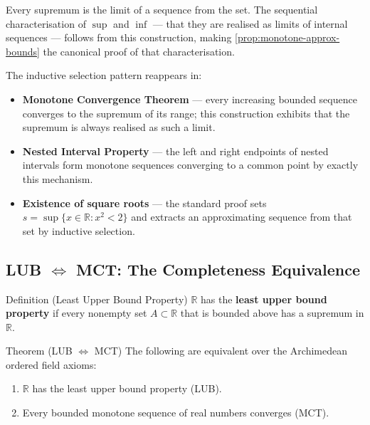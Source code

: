 \begin{remark}[Consequence]
Every supremum is the limit of a sequence from the set. The sequential
characterisation of $\sup$ and $\inf$ — that they are realised as limits
of internal sequences — follows from this construction, making
\cref{prop:monotone-approx-bounds} the canonical proof of that
characterisation.
\end{remark}

\begin{remark}
The inductive selection pattern reappears in:
\begin{itemize}
  \item \textbf{Monotone Convergence Theorem} — every increasing bounded
        sequence converges to the supremum of its range; this construction
        exhibits that the supremum is always realised as such a limit.
  \item \textbf{Nested Interval Property} — the left and right endpoints
        of nested intervals form monotone sequences converging to a common
        point by exactly this mechanism.
  \item \textbf{Existence of square roots} — the standard proof sets
        $s=\sup\{x\in\mathbb{R}:x^2<2\}$ and extracts an approximating
        sequence from that set by inductive selection.
\end{itemize}
\end{remark}

\subsection*{LUB $\Longleftrightarrow$ MCT: The Completeness Equivalence}
\label{subsec:LUB-MCT}

\begin{definitionbox}{Definition (Least Upper Bound Property)}
\label{def:LUB}
$\mathbb{R}$ has the \textbf{least upper bound property} if every nonempty
set $A\subset\mathbb{R}$ that is bounded above has a supremum in $\mathbb{R}$.
\end{definitionbox}

\begin{theorembox}{Theorem (LUB $\Longleftrightarrow$ MCT)}
\label{thm:LUB-iff-MCT}
The following are equivalent over the Archimedean ordered field axioms:
\begin{enumerate}[label=(\roman*)]
  \item $\mathbb{R}$ has the least upper bound property (LUB).
  \item Every bounded monotone sequence of real numbers converges (MCT).
\end{enumerate}
\end{theorembox}


